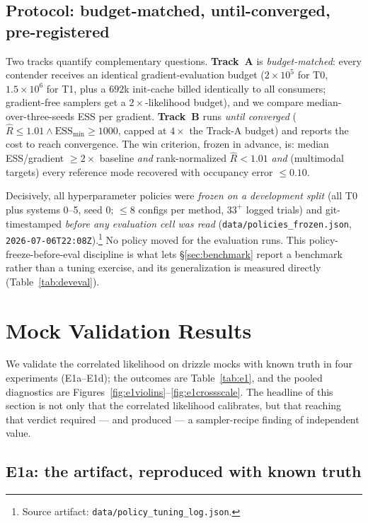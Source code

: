 \documentclass[11pt,letterpaper]{article}
\newcommand{\Rhat}{\ensuremath{\hat{R}}}
\newcommand{\ESS}{\textrm{ESS}}
\newcommand{\art}[1]{\footnote{Source artifact: \texttt{#1}.}}
\newcommand{\dfile}[1]{\texttt{#1}}
\begin{document}
\subsection{Protocol: budget-matched, until-converged, pre-registered}
\label{sec:protocol}

Two tracks quantify complementary questions. {\bf Track~A} is {\it
budget-matched}: every contender receives an identical gradient-evaluation
budget ($2\times10^5$ for T0, $1.5\times10^6$ for T1, plus a $692$k init-cache
billed identically to all consumers; gradient-free samplers get a
$2\times$-likelihood budget), and we compare median-over-three-seeds ESS per
gradient. {\bf Track~B} runs {\it until converged}
($\Rhat\le1.01\wedge\ESS_{\min}\ge1000$, capped at $4\times$ the Track-A
budget) and reports the cost to reach convergence. The win criterion, frozen in
advance, is: median ESS/gradient $\ge2\times$ baseline {\it and} rank-normalized
$\Rhat<1.01$ {\it and} (multimodal targets) every reference mode recovered with
occupancy error $\le0.10$.

Decisively, all hyperparameter policies were {\it frozen on a development split}
(all T0 plus \citet{gu2022gigalens} systems 0--5, seed 0; $\le8$ configs per
method, $33^+$ logged trials) and git-timestamped {\it before any evaluation
cell was read} (\dfile{data/policies\_frozen.json},
\texttt{2026-07-06T22:08Z}).\art{data/policy\_tuning\_log.json} No policy moved
for the evaluation runs. This policy-freeze-before-eval discipline is what lets
\S\ref{sec:benchmark} report a benchmark rather than a tuning exercise, and its
generalization is measured directly (Table~\ref{tab:deveval}).

\section{Mock Validation Results}
\label{sec:mocks}

We validate the correlated likelihood on drizzle mocks with known truth in four
experiments (E1a--E1d); the outcomes are Table~\ref{tab:e1}, and the pooled
diagnostics are Figures~\ref{fig:e1violins}--\ref{fig:e1crossscale}. The
headline of this section is not only that the correlated likelihood calibrates,
but that reaching that verdict required --- and produced --- a sampler-recipe
finding of independent value.

\subsection{E1a: the artifact, reproduced with known truth}
\end{document}
